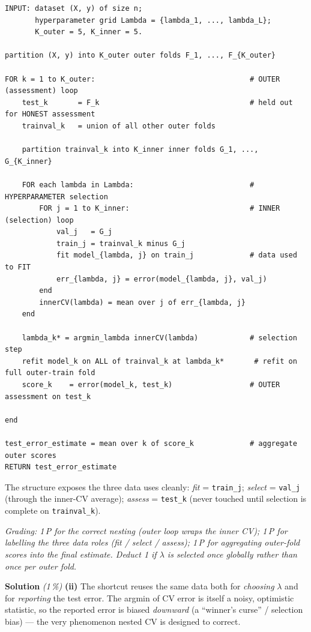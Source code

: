 \documentclass[11pt,a4paper]{article}
\newcommand{\subpoints}[1]{\textit{(#1\,\%)}}
\newcommand{\sol}{\noindent\textbf{Solution}}
\begin{document}
{\small
\begin{verbatim}
INPUT: dataset (X, y) of size n;
       hyperparameter grid Lambda = {lambda_1, ..., lambda_L};
       K_outer = 5, K_inner = 5.

partition (X, y) into K_outer outer folds F_1, ..., F_{K_outer}

FOR k = 1 to K_outer:                                    # OUTER (assessment) loop
    test_k       = F_k                                   # held out for HONEST assessment
    trainval_k   = union of all other outer folds

    partition trainval_k into K_inner inner folds G_1, ..., G_{K_inner}

    FOR each lambda in Lambda:                           # HYPERPARAMETER selection
        FOR j = 1 to K_inner:                            # INNER (selection) loop
            val_j   = G_j
            train_j = trainval_k minus G_j
            fit model_{lambda, j} on train_j             # data used to FIT
            err_{lambda, j} = error(model_{lambda, j}, val_j)
        end
        innerCV(lambda) = mean over j of err_{lambda, j}
    end

    lambda_k* = argmin_lambda innerCV(lambda)            # selection step
    refit model_k on ALL of trainval_k at lambda_k*       # refit on full outer-train fold
    score_k    = error(model_k, test_k)                  # OUTER assessment on test_k

end

test_error_estimate = mean over k of score_k             # aggregate outer scores
RETURN test_error_estimate
\end{verbatim}
}

\noindent The structure exposes the three data uses cleanly:
\emph{fit} = \texttt{train\_j}; \emph{select} = \texttt{val\_j} (through the inner-CV
average); \emph{assess} = \texttt{test\_k} (never touched until selection is complete on
\texttt{trainval\_k}).

\noindent\emph{Grading: 1\,P for the correct nesting (outer loop wraps the inner CV); 1\,P for
labelling the three data roles (fit / select / assess); 1\,P for aggregating outer-fold scores
into the final estimate. Deduct 1 if $\lambda$ is selected once globally rather than once per
outer fold.}

\medskip
\sol{} \subpoints{1} \textbf{(ii)} The shortcut reuses the same data both for \emph{choosing}
$\lambda$ and for \emph{reporting} the test error. The argmin of CV error is itself a noisy,
optimistic statistic, so the reported error is biased \emph{downward} (a ``winner's curse'' /
selection bias) --- the very phenomenon nested CV is designed to correct.
\end{document}
